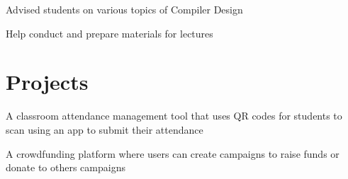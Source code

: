 \documentclass[]{deedy-resume-openfont}
\begin{document}
\begin{minipage}[t]{0.66\textwidth}
	\begin{tightemize}
		\item Advised students on various topics of Compiler Design
		\item Help conduct and prepare materials for lectures
	\end{tightemize}
	\sectionsep


	\section{Projects}
	\begin{tightemize}
		\item A classroom attendance management tool that uses QR codes for students to scan using an app to submit their attendance
	\end{tightemize}
	\sectionsep

	\begin{tightemize}
		\item A crowdfunding platform where users can create campaigns to raise funds or donate to others campaigns
	\end{tightemize}
	\sectionsep




\end{minipage}%
\hfill
\end{document}
